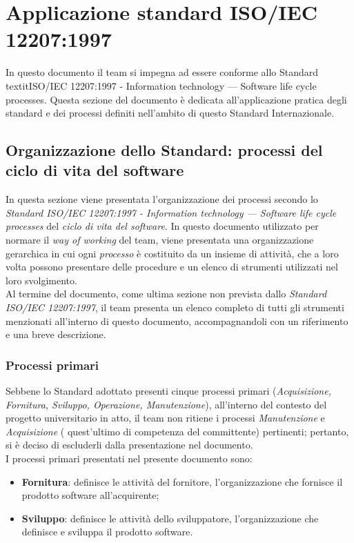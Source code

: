 \documentclass[10pt, a4paper]{article}
\begin{document}
\begin{itemize}
    \end{itemize}

\newpage

\section{Applicazione standard ISO/IEC 12207:1997}
In questo documento il team si impegna ad essere conforme allo Standard textit{ISO/IEC 12207:1997 - Information technology — Software life cycle processes}. 
Questa sezione del documento è dedicata all'applicazione pratica degli standard e dei processi definiti nell'ambito di questo Standard Internazionale.

\subsection{Organizzazione dello Standard: processi del ciclo di vita del software}
In questa sezione viene presentata l'organizzazione dei processi secondo lo \textit{Standard ISO/IEC 12207:1997 - Information technology 
— Software life cycle processes} del \textit{ciclo di vita del software\pg}. In questo documento utilizzato per normare il \textit{way of working} 
del team, viene presentata una organizzazione gerarchica in cui ogni \textit{processo\pg} è costituito da un insieme di attività, che a 
loro volta possono presentare delle procedure e un elenco di strumenti utilizzati nel loro svolgimento.\\
Al termine del documento, come ultima sezione non prevista dallo \textit{Standard ISO/IEC 12207:1997}, il team presenta un elenco completo di tutti gli strumenti 
menzionati all'interno di questo documento, accompagnandoli con un riferimento e una breve descrizione.

\subsubsection{Processi primari}
Sebbene lo Standard adottato presenti cinque processi primari (\textit{Acquisizione, Fornitura, Sviluppo, Operazione, Manutenzione}),
all'interno del contesto del progetto universitario in atto, il team non ritiene i processi \textit{Manutenzione} e \textit{Acquisizione} ( quest'ultimo di competenza del committente) pertinenti; pertanto, si è deciso di escluderli dalla presentazione nel documento.\\
I processi primari presentati nel presente documento sono:
\begin{itemize}
    \item \textbf{Fornitura}: definisce le attività del fornitore, l'organizzazione che fornisce il prodotto software all'acquirente;
    \item \textbf{Sviluppo}: definisce le attività dello sviluppatore, l'organizzazione che definisce e sviluppa il prodotto software.
\end{itemize}
\end{document}
